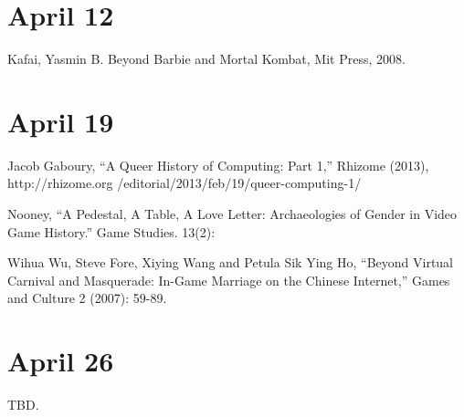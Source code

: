 \documentclass[11pt]{article}
\begin{document}
\section{April 12}


Kafai, Yasmin B. Beyond Barbie and Mortal Kombat, Mit Press, 2008.



\section{April 19}

Jacob Gaboury, “A Queer History of Computing: Part 1,” Rhizome (2013), http://rhizome.org /editorial/2013/feb/19/queer-computing-1/

Nooney, “A Pedestal, A Table, A Love Letter: Archaeologies of Gender in Video Game History.” Game Studies. 13(2):

Wihua Wu, Steve Fore, Xiying Wang and Petula Sik Ying Ho, “Beyond Virtual Carnival and Masquerade: In-Game Marriage on the Chinese Internet,” Games and Culture 2 (2007): 59-89.




\section{April 26}

TBD.
\end{document}
